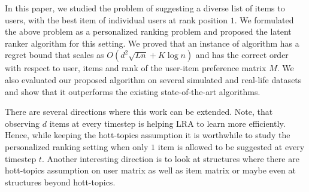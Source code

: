 In this paper, we studied the problem of suggesting a diverse list of items to users, with the best item of individual users at rank position $1$. We formulated the above problem as a personalized ranking problem and proposed the latent ranker algorithm for this setting. We proved that an instance of algorithm has  a regret bound that scales as $O\left(d^2\sqrt{L n} + K \log n\right)$ and has the correct order with respect to user, items and rank of the user-item preference matrix $M$. We also evaluated our proposed algorithm on several simulated and real-life datasets and show that it outperforms the existing state-of-the-art algorithms.

There are several directions where this work can be extended. Note, that observing $d$ items at every timestep is helping LRA to learn more efficiently. Hence,  while keeping the hott-topics assumption it is worthwhile to study the personalized ranking setting when only $1$ item is allowed to be suggested at every timestep $t$. Another interesting direction is to look at structures where there are hott-topics assumption on user matrix as well as item matrix or maybe even at structures beyond hott-topics.


